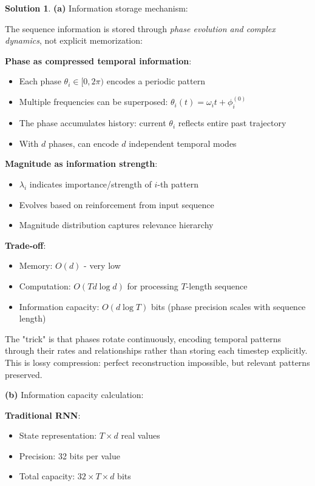 \documentclass[12pt,a4paper]{book}
\theoremstyle{definition}
\newtheorem{solution}{Solution}[section]
\theoremstyle{remark}
\begin{document}
\begin{solution}
\textbf{(a)} Information storage mechanism:

The sequence information is stored through \textit{phase evolution and complex dynamics}, not explicit memorization:

\textbf{Phase as compressed temporal information}:
\begin{itemize}
\item Each phase $\theta_i \in [0, 2\pi)$ encodes a periodic pattern
\item Multiple frequencies can be superposed: $\theta_i(t) = \omega_i t + \phi_i^{(0)}$
\item The phase accumulates history: current $\theta_i$ reflects entire past trajectory
\item With $d$ phases, can encode $d$ independent temporal modes
\end{itemize}

\textbf{Magnitude as information strength}:
\begin{itemize}
\item $\lambda_i$ indicates importance/strength of $i$-th pattern
\item Evolves based on reinforcement from input sequence
\item Magnitude distribution captures relevance hierarchy
\end{itemize}

\textbf{Trade-off}:
\begin{itemize}
\item Memory: $O(d)$ - very low
\item Computation: $O(Td \log d)$ for processing $T$-length sequence
\item Information capacity: $O(d \log T)$ bits (phase precision scales with sequence length)
\end{itemize}

The "trick" is that phases rotate continuously, encoding temporal patterns through their rates and relationships rather than storing each timestep explicitly. This is lossy compression: perfect reconstruction impossible, but relevant patterns preserved.

\textbf{(b)} Information capacity calculation:

\textbf{Traditional RNN}:
\begin{itemize}
\item State representation: $T \times d$ real values
\item Precision: 32 bits per value
\item Total capacity: $32 \times T \times d$ bits
\end{itemize}


\end{solution}
\end{document}
